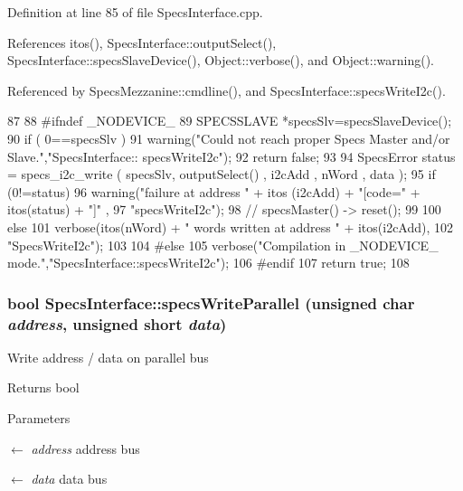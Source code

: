 Definition at line 85 of file SpecsInterface.cpp.

References itos(), SpecsInterface::outputSelect(), SpecsInterface::specsSlaveDevice(), Object::verbose(), and Object::warning().

Referenced by SpecsMezzanine::cmdline(), and SpecsInterface::specsWriteI2c().


\begin{DoxyCode}
87                                           {
88 #ifndef _NODEVICE_
89   SPECSSLAVE *specsSlv=specsSlaveDevice();
90   if ( 0==specsSlv ){
91     warning("Could not reach proper Specs Master and/or Slave.","SpecsInterface::
      specsWriteI2c");
92     return false;
93   }
94   SpecsError status = specs_i2c_write ( specsSlv, outputSelect() , i2cAdd , nWord
       , data );
95   if (0!=status){
96     warning("failure at address " + itos (i2cAdd) + "[code=" + itos(status) + "]"
       ,
97             "specsWriteI2c");
98     //    specsMaster() -> reset();
99   }
100   else {
101     verbose(itos(nWord) + " words written at address " + itos(i2cAdd),
102             "SpecsWriteI2c");
103   }
104 #else
105   verbose("Compilation in _NODEVICE_ mode.","SpecsInterface::specsWriteI2c");
106 #endif
107   return true;
108 }
\end{DoxyCode}
\hypertarget{classSpecsInterface_a232c39e46091c493ad9d061428dd2a8b}{
\subsubsection[{specsWriteParallel}]{\setlength{\rightskip}{0pt plus 5cm}bool SpecsInterface::specsWriteParallel (unsigned char {\em address}, \/  unsigned short {\em data})}}
\label{classSpecsInterface_a232c39e46091c493ad9d061428dd2a8b}
Write address / data on parallel bus

\begin{DoxyReturn}{Returns}
bool 
\end{DoxyReturn}

\begin{DoxyParams}{Parameters}
\item[\mbox{$\leftarrow$} {\em address}]address bus \item[\mbox{$\leftarrow$} {\em data}]data bus \end{DoxyParams}


